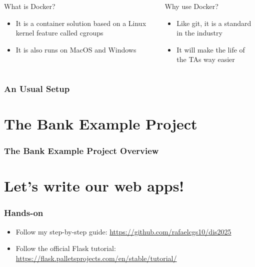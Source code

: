 \documentclass[fleqn,aspectratio=169,10pt]{beamer}
\begin{document}
\begin{frame}
\begin{columns}
\begin{column}{.45\textwidth}
\begin{block}{What is Docker?}
\begin{itemize}
            \pause
      \item It is a container solution based on a Linux kernel feature called cgroups
      \item It is also runs on MacOS and Windows
    \end{itemize}
  \end{block}
    \end{column}
    \pause
    \begin{column}{.45\textwidth}
      \begin{block}{Why use Docker?}
        \begin{itemize}
          \item Like git, it is a standard in the industry
          \item It will make the life of the TAs way easier
        \end{itemize}
      \end{block}
    \end{column}
  \end{columns}
\end{frame}

\begin{frame}
  \frametitle{An Usual Setup}

\end{frame}

\section{The Bank Example Project}
\begin{frame}
  \frametitle{The Bank Example Project Overview}

\end{frame}

\section{Let's write our web apps!}
\begin{frame}
  \frametitle{Hands-on}
  \begin{itemize}
    \item Follow my step-by-step guide: \url{https://github.com/rafaelcgs10/dis2025}
    \item Follow the official Flask tutorial: \url{https://flask.palletsprojects.com/en/stable/tutorial/}
  \end{itemize}
\end{frame}
\end{document}
